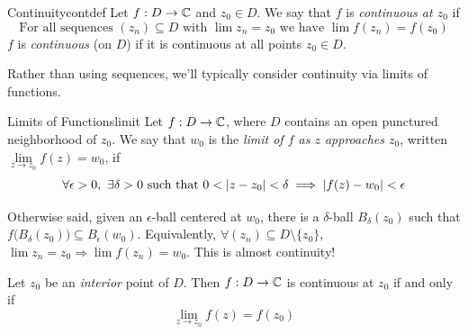 \goodbreak


\begin{defn}{Continuity}{contdef}
	Let $f:D\to\mathbb{C}$ and $z_0\in D$. We say that $f$ is \emph{continuous at $z_0$} if
	\[
		\text{For all sequences } (z_n)\subseteq D\text{ with }\lim z_n=z_0\text{ we have }\lim f(z_n) = f(z_0)
	\]
	$f$ is \emph{continuous} (on $D$) if it is continuous at all points $z_0\in D$.
\end{defn}


Rather than using sequences, we'll typically consider continuity via limits of functions.

\begin{defn}{Limits of Functions}{limit}
	Let $f:D\to\mathbb{C}$, where $D$ contains an open punctured neighborhood of $z_0$. We say that $w_0$ is the \emph{limit of $f$ as $z$ approaches $z_0$}, written $\lim\limits_{z\to z_0}f(z)=w_0$, if
	\[
		\forall \epsilon>0,\ \exists \delta>0\text{ such that } 0<\left| z-z_0\right|<\delta\implies \left| f(z)-w_0\right|<\epsilon
	\]
\end{defn}

Otherwise said, given an $\epsilon$-ball centered at $w_0$, there is a $\delta$-ball $B_\delta(z_0)$ such that $f\bigl(B_\delta(z_0)\bigr)\subseteq B_\epsilon (w_0)$. Equivalently, $\forall (z_n)\subseteq D\setminus\{z_0\}$, $\lim z_n=z_0\Longrightarrow \lim f(z_n)=w_0$. This is almost continuity!

\begin{thm}{}{}
	Let $z_0$ be an \emph{interior} point of $D$. Then $f:D\to\mathbb{C}$ is continuous at $z_0$ if and only if
	\[
		\lim\limits_{z\to z_0}f(z)=f(z_0)
	\]
\end{thm}

\medbreak



